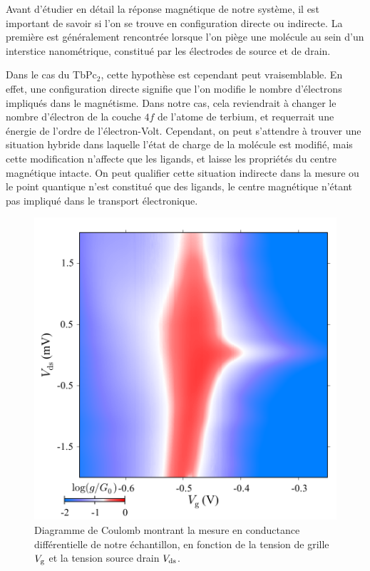 Avant d'étudier en détail la réponse magnétique de notre système, il est important de savoir si l'on se trouve en configuration directe ou indirecte. La première est généralement rencontrée lorsque l'on piège une molécule au sein d'un interstice nanométrique, constitué par les électrodes de source et de drain.

Dans le cas du TbPc$_{2}$, cette hypothèse est cependant peut vraisemblable. En effet, une configuration directe signifie que l'on modifie le nombre d'électrons impliqués dans le magnétisme. Dans notre cas, cela reviendrait à changer le nombre d'électron de la couche $4f$ de l'atome de terbium, et requerrait une énergie de l'ordre de l'électron-Volt. Cependant, on peut s'attendre à trouver une situation hybride dans laquelle l'état de charge de la molécule est modifié, mais cette modification n'affecte que les ligands, et laisse les propriétés du centre magnétique intacte. On peut qualifier cette situation indirecte dans la mesure ou le point quantique n'est constitué que des ligands, le centre magnétique n'étant pas impliqué dans le transport électronique.

\begin{figure}
\parbox{7cm}{
\includegraphics[scale=0.45]{Resultats/CoulombMap/CoulombMap.pdf} 
}
\parbox{6.5cm}{\caption{Diagramme de Coulomb montrant la mesure en conductance différentielle de notre échantillon, en fonction de la tension de grille $V_{\rm{g}}$ et la tension source drain $V_{\rm{ds}}$.}
\label{coulomb_map}
}
\end{figure}

